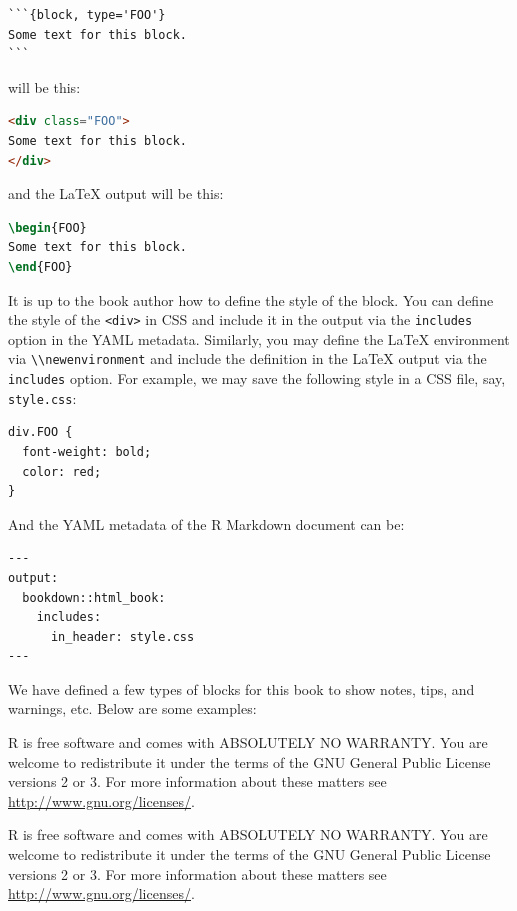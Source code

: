 \documentclass[doctor,openright,twoside]{sjtuthesis}
\newcommand{\passthrough}[1]{#1}
\theoremstyle{plain}
\theoremstyle{definition}
\theoremstyle{remark}
\theoremstyle{ocrenumbox}
\theoremstyle{plain}
\let\BeginKnitrBlock\begin \let\EndKnitrBlock\end
\begin{document}
\begin{lstlisting}
```{block, type='FOO'}
Some text for this block.
```
\end{lstlisting}

will be this:

\begin{lstlisting}[language=HTML]
<div class="FOO">
Some text for this block.
</div>
\end{lstlisting}

and the LaTeX output will be this:

\begin{lstlisting}[language=TeX]
\begin{FOO}
Some text for this block.
\end{FOO}
\end{lstlisting}

It is up to the book author how to define the style of the block. You
can define the style of the \passthrough{\lstinline!<div>!} in CSS and
include it in the output via the \passthrough{\lstinline!includes!}
option in the YAML metadata. Similarly, you may define the LaTeX
environment via \passthrough{\lstinline!\\newenvironment!} and include
the definition in the LaTeX output via the
\passthrough{\lstinline!includes!} option. For example, we may save the
following style in a CSS file, say, \passthrough{\lstinline!style.css!}:

\begin{lstlisting}
div.FOO {
  font-weight: bold;
  color: red;
}
\end{lstlisting}

And the YAML metadata of the R Markdown document can be:

\begin{lstlisting}
---
output:
  bookdown::html_book:
    includes:
      in_header: style.css
---
\end{lstlisting}

We have defined a few types of blocks for this book to show notes, tips,
and warnings, etc. Below are some examples:

\BeginKnitrBlock{rmdnote}
R is free software and comes with ABSOLUTELY NO WARRANTY. You are
welcome to redistribute it under the terms of the GNU General Public
License versions 2 or 3. For more information about these matters see
\url{http://www.gnu.org/licenses/}.
\EndKnitrBlock{rmdnote}

\BeginKnitrBlock{rmdcaution}
R is free software and comes with ABSOLUTELY NO WARRANTY. You are
welcome to redistribute it under the terms of the GNU General Public
License versions 2 or 3. For more information about these matters see
\url{http://www.gnu.org/licenses/}.
\EndKnitrBlock{rmdcaution}
\end{document}
